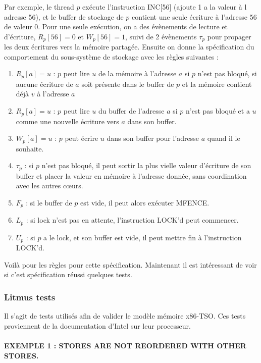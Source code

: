 \documentclass[12pt,a4paper]{article}
\begin{document}
Par exemple, le thread $p$ exécute l'instruction INC[56] (ajoute 1 a la valeur à l adresse 56), et le buffer de stockage de $p$ contient une seule écriture à l'adresse 56 de valeur 0. Pour une seule exécution, on a des évènements de lecture et d'écriture, $R_p[56] = 0$ et $W_p[56] = 1$, suivi de 2 évènements $\tau_p$ pour propager les deux écritures vers la mémoire partagée.
Ensuite on donne la spécification du comportement du sous-système de stockage avec les règles suivantes :
\begin{enumerate}
	\item $R_p[a] = u$ : $p$ peut lire $u$ de la mémoire à l'adresse $a$ si $p$ n'est pas bloqué, si aucune écriture de $a$ soit présente dans le buffer de $p$ et la mémoire contient déjà $v$ à l'adresse $a$
	\item $R_p[a] = u$ : $p$ peut lire $u$ du buffer de l'adresse $a$ si $p$ n'est pas bloqué et a $u$ comme une nouvelle écriture vers $a$ dans son buffer.
	\item $W_p[a] = u$ : $p$ peut écrire $u$ dans son buffer pour l'adresse $a$ quand il le souhaite.
	\item $\tau_p$ : si $p$ n'est pas bloqué, il peut sortir la plus vielle valeur d'écriture de son buffer et placer la valeur en mémoire à l'adresse donnée, sans coordination avec les autres cœurs.
	\item $F_p$ : si le buffer de $p$ est vide, il peut alors exécuter MFENCE.
	\item $L_p$ : si lock n'est pas en attente, l'instruction LOCK'd peut commencer.
	\item $U_p$ : si $p$ a le lock, et son buffer est vide, il peut mettre fin à l'instruction LOCK'd.
\end{enumerate}

Voilà pour les règles pour cette spécification. Maintenant il est intéressant de voir si c'est spécification réussi quelques tests.

\subsubsection*{Litmus tests}

Il s'agit de tests utilisés afin de valider le modèle mémoire x86-TSO. Ces tests proviennent de la documentation d'Intel sur leur processeur.

\paragraph{EXEMPLE 1 : STORES ARE NOT REORDERED WITH OTHER STORES.}
\end{document}
